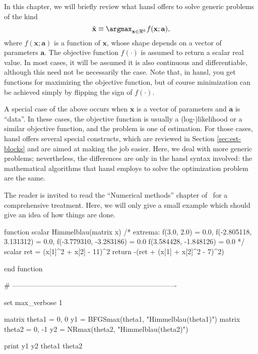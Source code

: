 In this chapter, we will briefly review what hansl offers to solve
generic problems of the kind
\[
\hat{\mathbf{x}} \equiv \argmax_{\mathbf{x} \in \Re^k} f(\mathbf{x}; \mathbf{a}),
\]
where $f(\mathbf{x}; \mathbf{a})$ is a function of $\mathbf{x}$, whose
shape depends on a vector of parameters $\mathbf{a}$. The objective
function $f(\cdot)$ is assumed to return a scalar real value. In most
cases, it will be assumed it is also continuous and differentiable,
although this need not be necessarily the case. Note that, in hansl,
you get functions for maximizing the objective function, but of course
minimization can be achieved simply by flipping the sign of
$f(\cdot)$.

A special case of the above occurs when $\mathbf{x}$ is a vector of
parameters and $\mathbf{a}$ is ``data''. In these cases, the objective
function is usually a (log-)likelihood or a similar objective
function, and the problem is one of estimation. For those cases, hansl
offers several special constructs, which are reviewed in Section
\ref{sec:est-blocks} and are aimed at making the job easier. Here, we
deal with more generic problems; nevertheless, the differences are
only in the hansl syntax involved: the mathematical algorithms that
hansl employs to solve the optimization problem are the same.

The reader is invited to read the ``Numerical methods'' chapter of
\GUG\ for a comprehensive treatment. Here, we will only give a small
example which should give an idea of how things are done.

\begin{code}
function scalar Himmelblau(matrix x)
    /* extrema:
    f(3.0, 2.0) = 0.0, 
    f(-2.805118, 3.131312) = 0.0,
    f(-3.779310, -3.283186) = 0.0
    f(3.584428, -1.848126) = 0.0
    */
    scalar ret = (x[1]^2 + x[2] - 11)^2
    return -(ret + (x[1] + x[2]^2 - 7)^2)

end function

# ----------------------------------------------------------------------

set max_verbose 1

matrix theta1 = { 0, 0 }
y1 = BFGSmax(theta1, "Himmelblau(theta1)")
matrix theta2 = { 0, -1 }
y2 = NRmax(theta2, "Himmelblau(theta2)")

print y1 y2 theta1 theta2
\end{code}


